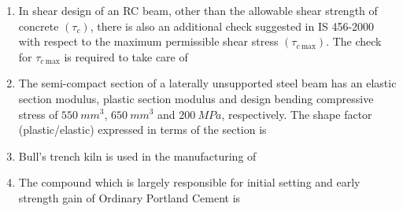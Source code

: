 \documentclass[journal]{IEEEtran}
\begin{document}
\begin{enumerate}[resume]
\item In shear design of an RC beam, other than the allowable shear strength of concrete $(\tau_c)$, there is also an additional check suggested in IS 456-2000 with respect to the maximum permissible shear stress $(\tau_{c \ \text{max}})$. The check for $\tau_{c \ \text{max}}$ is required to take care of \hfill {}
\begin{enumerate}
\end{enumerate}


\item The semi-compact section of a laterally unsupported steel beam has an elastic section modulus, plastic section modulus and design bending compressive stress of $550 \ mm^3$, $650 \ mm^3$ and $200 \ MPa$, respectively. The shape factor (plastic/elastic) expressed in terms of the section is \hfill {}
\begin{enumerate}
\end{enumerate}


\item Bull's trench kiln is used in the manufacturing of \hfill {}
\begin{enumerate}
\end{enumerate}


\item The compound which is largely responsible for initial setting and early strength gain of Ordinary Portland Cement is \hfill {}
\begin{enumerate}
\end{enumerate}



\end{enumerate}
\end{document}
